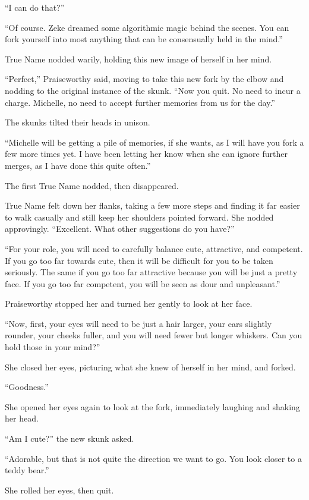 ``I can do that?''

``Of course. Zeke dreamed some algorithmic magic behind the scenes. You can fork yourself into most anything that can be consensually held in the mind.''

True Name nodded warily, holding this new image of herself in her mind.

``Perfect,'' Praiseworthy said, moving to take this new fork by the elbow and nodding to the original instance of the skunk. ``Now you quit. No need to incur a charge. Michelle, no need to accept further memories from us for the day.''

The skunks tilted their heads in unison.

``Michelle will be getting a pile of memories, if she wants, as I will have you fork a few more times yet. I have been letting her know when she can ignore further merges, as I have done this quite often.''

The first True Name nodded, then disappeared.

True Name felt down her flanks, taking a few more steps and finding it far easier to walk casually and still keep her shoulders pointed forward. She nodded approvingly. ``Excellent. What other suggestions do you have?''

``For your role, you will need to carefully balance cute, attractive, and competent. If you go too far towards cute, then it will be difficult for you to be taken seriously. The same if you go too far attractive because you will be just a pretty face. If you go too far competent, you will be seen as dour and unpleasant.''

Praiseworthy stopped her and turned her gently to look at her face.

``Now, first, your eyes will need to be just a hair larger, your ears slightly rounder, your cheeks fuller, and you will need fewer but longer whiskers. Can you hold those in your mind?''

She closed her eyes, picturing what she knew of herself in her mind, and forked.

``Goodness.''

She opened her eyes again to look at the fork, immediately laughing and shaking her head.

``Am I cute?'' the new skunk asked.

``Adorable, but that is not quite the direction we want to go. You look closer to a teddy bear.''

She rolled her eyes, then quit.

